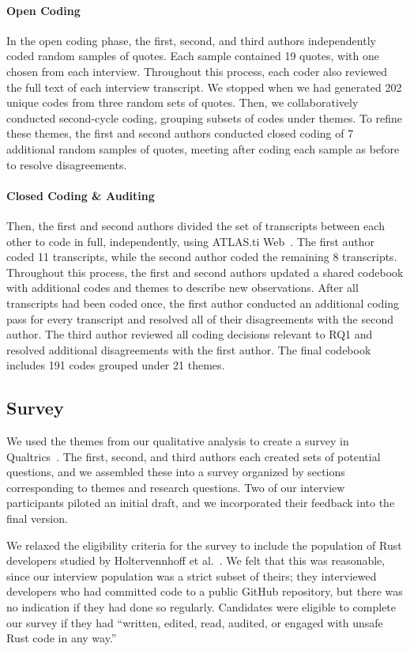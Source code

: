 \paragraph{Open Coding} In the open coding phase, the first, second, and third authors independently coded random samples of quotes. Each sample contained 19 quotes, with one chosen from each interview. Throughout this process, each coder also reviewed the full text of each interview transcript. We stopped when we had generated 202 unique codes from three random sets of quotes. Then, we collaboratively conducted second-cycle coding, grouping subsets of codes under themes. To refine these themes, the first and second authors conducted closed coding of 7 additional random samples of quotes, meeting after coding each sample as before to resolve disagreements.

\paragraph{Closed Coding \& Auditing} Then, the first and second authors divided the set of transcripts between each other to code in full, independently, using ATLAS.ti Web~\cite{atlasti}. The first author coded 11 transcripts, while the second author coded the remaining 8 transcripts. Throughout this process, the first and second authors updated a shared codebook with additional codes and themes to describe new observations. After all transcripts had been coded once, the first author conducted an additional coding pass for every transcript and resolved all of their disagreements with the second author. The third author reviewed all coding decisions relevant to RQ1 and resolved additional disagreements with the first author. The final codebook includes 191 codes grouped under 21 themes. 

\subsection{Survey}
We used the themes from our qualitative analysis to create a survey in Qualtrics~\cite{qualtrics}. The first, second, and third authors each created sets of potential questions, and we assembled these into a survey organized by sections corresponding to themes and research questions. Two of our interview participants piloted an initial draft, and we incorporated their feedback into the final version.

We relaxed the eligibility criteria for the survey to include the population of Rust developers studied by Holtervennhoff et al.~\cite{holtervennhoff23}. We felt that this was reasonable, since our interview population was a strict subset of theirs; they interviewed developers who had committed \unsafe code to a public GitHub repository, but there was no indication if they had done so regularly. Candidates were eligible to complete our survey if they had ``written, edited, read, audited, or engaged with unsafe Rust code in any way.'' 

